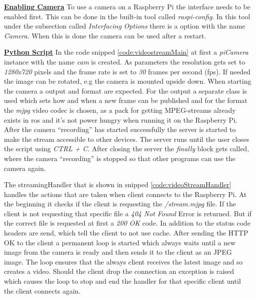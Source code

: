 \textbf{\underline{Enabling Camera}}\newline
To use a camera on a Raspberry Pi the interface needs to be enabled first. This can be done in the built-in tool called \textit{raspi-config}. In this tool under the subsection called \textit{Interfacing Options} there is a option with the name \textit{Camera}. When this is done the camera can be used after a restart.

\textbf{\underline{Python Script}}\newline
In the code snipped \ref{code:videostreamMain} at first a \textit{piCamera} instance with the name \textit{cam} is created. As parameters the resolution gets set to \textit{1280x720} pixels and the frame rate is set to \textit{30} frames per second (\gls{fps}). If needed the image can be rotated, e.g the camera is mounted upside down. When starting the camera a output and format are expected. For the output a separate class is used which sets how and when a new frame can be published and for the format the \textit{mjpg} video codec is chosen, as a pack for getting MPEG-streams already exists in \gls{ros} and it's not power hungry when running it on the Raspberry Pi. \newline
After the camera \enquote{recording} has started successfully the server is started to make the stream accessible to other devices. The server runs until the user closes the script using \textit{CTRL + C}. After closing the server the \textit{finally} block gets called, where the camera \enquote{recording} is stopped so that other programs can use the camera again.


The streamingHandler that is shown in snipped \ref{code:videoStreamHandler} handles the actions that are taken when client connects to the Raspberry Pi. At the beginning it checks if the client is requesting the \textit{/stream.mjpg} file. If the client is not requesting that specific file a \textit{404 Not Found} Error is returned. But if the correct file is requested at first a \textit{200 OK} code. In addition to the status code headers are send, which tell the client to not use cache. After sending the HTTP OK to the client a permanent loop is started which always waits until a new image from the camera is ready and then sends it to the client as an JPEG image. The loop ensures that the always client receives the latest image and so creates a video. Should the client drop the connection an exception is raised which causes the loop to stop and end the handler for that specific client until the client connects again.


